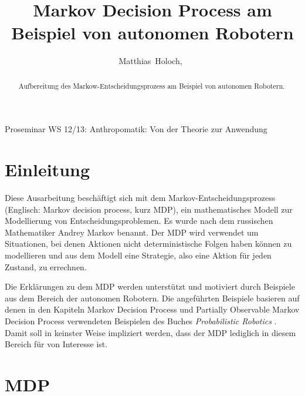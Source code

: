 \documentclass[a4paper]{IEEEtran}
\begin{document}
\title{Markov Decision Process am Beispiel von autonomen Robotern} %

\author{Matthias~Holoch,~}%




%
{Proseminar WS 12/13: Anthropomatik: Von der Theorie zur Anwendung}



\maketitle


\begin{abstract}
Aufbereitung des Markow-Entscheidungsprozess am Beispiel von autonomen Robotern. 
\end{abstract}


\section{Einleitung}
Diese Ausarbeitung beschäftigt sich mit dem Markov-Entscheidungsprozess (Englisch: Markov decision process, kurz MDP), ein mathematisches Modell zur Modellierung von Entscheidungsproblemen. Es wurde nach dem russischen Mathematiker Andrey Markov benannt. Der MDP wird verwendet um Situationen, bei denen Aktionen nicht deterministische Folgen haben können zu modellieren und aus dem Modell eine Strategie, also eine Aktion für jeden Zustand, zu errechnen.

Die Erklärungen zu dem MDP werden unterstützt und motiviert durch Beispiele aus dem Bereich der autonomen Robotern. Die angeführten Beispiele basieren auf denen in den Kapiteln Markov Decision Process und Partially Observable Markov Decision Process verwendeten Beispielen des Buches \emph{Probabilistic Robotics} \cite{PR_ThrunBurgardFox}. Damit soll in keinster Weise impliziert werden, dass der MDP lediglich in diesem Bereich für von Interesse ist.


\section{MDP}
\end{document}

